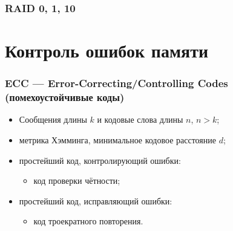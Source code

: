 \begin{frame}
\frametitle{RAID 0, 1, 10}
\end{frame}

\section {Контроль ошибок памяти}

\begin{frame}
\frametitle{ECC — Error-Correcting/Controlling Codes (помехоустойчивые коды)}


\begin{itemize}%
    \item Сообщения длины $k$ и кодовые слова длины $n$, $n > k$;

    \item метрика Хэмминга, минимальное кодовое расстояние $d$;

    \item простейший код, контролирующий ошибки:
    \begin{itemize}
        \item код проверки чётности;
    \end{itemize}

    \item простейший код, исправляющий ошибки:
    \begin{itemize}
        \item код троекратного повторения.
    \end{itemize}
\end{itemize}
\end{frame}




